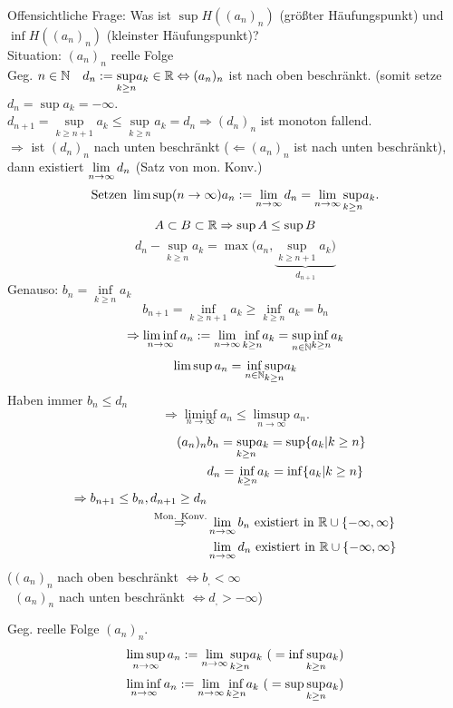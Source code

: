 \documentclass[../ana1.tex]{subfiles}
\begin{document}
Offensichtliche Frage: Was ist \( \sup H((a_n)_n) \) (größter Häufungspunkt) und \(  \inf H((a_n)_n) \) (kleinster Häufungspunkt)?\\
Situation: \((a_n)_n\) reelle Folge\\
Geg. \(n\in\mathbb{N} \quad d_n := \underset{k\geq n}{\sup}a_k \in \mathbb{R} \Leftrightarrow (a_n)_n\) ist nach oben beschränkt. (somit setze \(d_n = \sup a_k = -\infty \).\\
\( d_{n+1} = \underset{k\geq n+1}{\sup}a_k \leq \underset{k\geq n}{\sup}a_k = d_n \Longrightarrow (d_n)_n \) ist monoton fallend.\\
\( \Rightarrow \) ist \((d_n)_n\) nach unten beschränkt (\( \Leftarrow (a_n)_n \) ist nach unten beschränkt), dann existiert \( \lim\limits_{n\rightarrow\infty} d_n \) (Satz von mon. Konv.)\\
\[\text{Setzen } \limsup\limits(n\rightarrow\infty) a_n := \lim\limits_{n\rightarrow\infty} d_n = \lim\limits_{n\rightarrow\infty} \underset{k\geq n}{\sup} a_k. \]
\[ A\subset B\subset \mathbb{R} \Rightarrow \sup A \leq \sup B \]
\[ d_n - \underset{k\geq n}{\sup} a_k = \max(a_n, \underbrace{\underset{k\geq n+1}{\sup} a_k)}_{d_{n+1}} \]
Genauso: \(b_n = \underset{k\geq n}{\inf} a_k \)
\[ b_{n+1} = \underset{k\geq n+1}{\inf} a_k \geq \underset{k\geq n}{\inf} a_k = b_n \]
\[ \Rightarrow \liminf\limits_{n\rightarrow\infty} a_n := \lim\limits_{n\rightarrow\infty} \underset{k\geq n}{\inf} a_k = \underset{n\in\mathbb{N}}{\sup} \underset{k\geq n}{\inf} a_k \]
\[ \limsup a_n = \underset{n\in\mathbb{N}}{\inf} \underset{k\geq n}{\sup} a_k \]
Haben immer \(b_n \leq d_n\)
\[ \Rightarrow \liminf\limits_{n\rightarrow\infty} a_n \leq \limsup\limits_{n\rightarrow\infty} a_n. \]
\begin{align*}
	(a_n)_n &b_n = \underset{k\geq n}{\sup} a_k = \sup\{ a_k | k\geq n \}\\
	&d_n = \underset{k\geq n}{\inf} a_k = \inf\{ a_k | k\geq n \}\\
	\Rightarrow b_{n+1} \leq b_n, d_{n+1} \geq d_n\\
	\overset{\text{Mon. Konv.}}{\Rightarrow} &\lim\limits_{n\rightarrow\infty} b_n \text{ existiert in }\mathbb{R} \cup \{-\infty, \infty\}\\
	&\lim\limits_{n\rightarrow\infty} d_n \text{ existiert in }\mathbb{R} \cup \{-\infty, \infty\}
\end{align*}
(\((a_n)_n\) nach oben beschränkt \(\Leftrightarrow b_, < \infty \)\\\
\((a_n)_n\) nach unten beschränkt \(\Leftrightarrow d_, > -\infty \))
\begin{defi}
	Geg. reelle Folge \((a_n)_n\).\\
	\begin{align*}
		\limsup\limits_{n\rightarrow\infty} a_n := \lim\limits_{n\rightarrow\infty}\underset{k\geq n}{\sup} a_k \text{ (}=\inf\underset{k\geq n}{\sup}a_k\text{)}\\
		\liminf\limits_{n\rightarrow\infty} a_n := \lim\limits_{n\rightarrow\infty}\underset{k\geq n}{\inf} a_k \text{ (}=\sup\underset{k\geq n}{\sup}a_k\text{)}
	\end{align*}
\end{defi}
\end{document}
